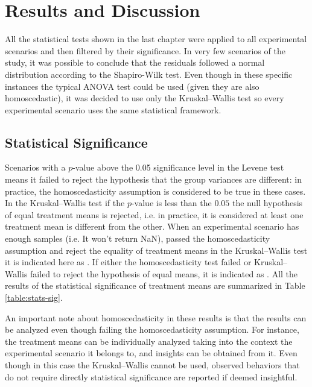 \chapter{Results and Discussion}
\label{cap:results}

All the statistical tests shown in the last chapter were applied to all experimental scenarios and then filtered by their significance. In very few scenarios of the study, it was possible to conclude that the residuals followed a normal distribution according to the Shapiro-Wilk test. Even though in these specific instances the typical ANOVA test could be used (given they are also homoscedastic), it was decided to use only the Kruskal–Wallis test so every experimental scenario uses the same statistical framework.

\section{Statistical Significance}
\label{sec:stats-significance}

Scenarios with a $p$-value above the 0.05 significance level in the Levene test means it failed to reject the hypothesis that the group variances are different: in practice, the homoscedasticity assumption is considered to be true in these cases. In the Kruskal–Wallis test if the $p$-value is less than the $0.05$ the null hypothesis of equal treatment means is rejected, i.e. in practice, it is considered at least one treatment mean is different from the other. When an experimental scenario has enough samples (i.e. It won't return NaN), passed the homoscedasticity assumption and reject the equality of treatment means in the Kruskal–Wallis test it is indicated here as \ok. If either the homoscedasticity test failed or Kruskal–Wallis failed to reject the hypothesis of equal means, it is indicated as \notok. All the results of the statistical significance of treatment means are summarized in Table \ref{table:stats-sig}.

An important note about homoscedasticity in these results is that the results can be analyzed even though failing the homoscedasticity assumption. For instance, the treatment means can be individually analyzed taking into the context the experimental scenario it belongs to, and insights can be obtained from it. Even though in this case the Kruskal–Wallis cannot be used, observed behaviors that do not require directly statistical significance are reported if deemed insightful.

